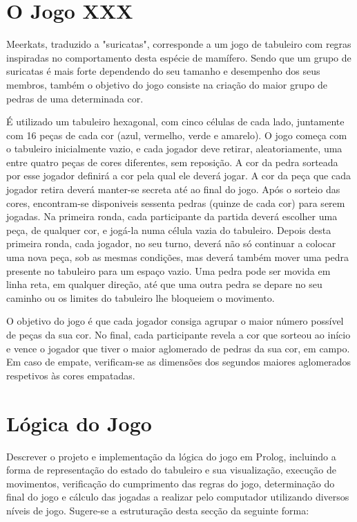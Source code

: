 \documentclass[a4paper]{article}
\begin{document}
\section{O Jogo XXX}

Meerkats, traduzido a "suricatas", corresponde a um jogo de tabuleiro com regras inspiradas no comportamento desta espécie de mamífero. Sendo que um grupo de suricatas é mais forte dependendo do seu tamanho e desempenho dos seus membros, também o objetivo do jogo consiste na criação do maior grupo de pedras de uma determinada cor.

É utilizado um tabuleiro hexagonal, com cinco células de cada lado, juntamente com 16 peças de cada cor (azul, vermelho, verde e amarelo).
O jogo começa com o tabuleiro inicialmente vazio, e cada jogador deve retirar, aleatoriamente, uma entre quatro peças de cores diferentes, sem reposição. A cor da pedra sorteada por esse jogador definirá a cor pela qual ele deverá jogar. A cor da peça que cada jogador retira deverá manter-se secreta até ao final do jogo.
Após o sorteio das cores, encontram-se disponiveis sessenta pedras (quinze de cada cor) para serem jogadas. Na primeira ronda, cada participante da partida deverá escolher uma peça, de qualquer cor, e jogá-la numa célula vazia do tabuleiro. Depois desta primeira ronda, cada jogador, no seu turno, deverá não só continuar a colocar uma nova peça, sob as mesmas condições, mas deverá também mover uma pedra presente no tabuleiro para um espaço vazio. Uma pedra pode ser movida em linha reta, em qualquer direção, até que uma outra pedra se depare no seu caminho ou os limites do tabuleiro lhe bloqueiem o movimento.

O objetivo do jogo é que cada jogador consiga agrupar o maior número possível de peças da sua cor. No final, cada participante revela a cor que sorteou ao início e vence o jogador que tiver o maior aglomerado de pedras da sua cor, em campo. Em caso de empate, verificam-se as dimensões dos segundos maiores aglomerados respetivos às cores empatadas.


\section{Lógica do Jogo}

Descrever o projeto e implementação da lógica do jogo em Prolog, incluindo a forma de representação do estado do tabuleiro e sua visualização, execução de movimentos, verificação do cumprimento das regras do jogo, determinação do final do jogo e cálculo das jogadas a realizar pelo computador utilizando diversos níveis de jogo. Sugere-se a estruturação desta secção da seguinte forma:
\end{document}
